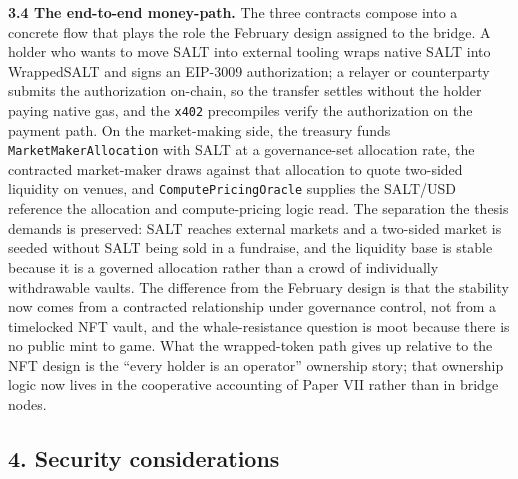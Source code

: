 \textbf{3.4 The end-to-end money-path.} The three contracts compose into
a concrete flow that plays the role the February design assigned to the
bridge. A holder who wants to move SALT into external tooling wraps
native SALT into WrappedSALT and signs an EIP-3009 authorization; a
relayer or counterparty submits the authorization on-chain, so the
transfer settles without the holder paying native gas, and the
\texttt{x402} precompiles verify the authorization on the payment path.
On the market-making side, the treasury funds
\texttt{MarketMakerAllocation} with SALT at a governance-set allocation
rate, the contracted market-maker draws against that allocation to quote
two-sided liquidity on venues, and \texttt{ComputePricingOracle}
supplies the SALT/USD reference the allocation and compute-pricing logic
read. The separation the thesis demands is preserved: SALT reaches
external markets and a two-sided market is seeded without SALT being
sold in a fundraise, and the liquidity base is stable because it is a
governed allocation rather than a crowd of individually withdrawable
vaults. The difference from the February design is that the stability
now comes from a contracted relationship under governance control, not
from a timelocked NFT vault, and the whale-resistance question is moot
because there is no public mint to game. What the wrapped-token path
gives up relative to the NFT design is the ``every holder is an
operator'' ownership story; that ownership logic now lives in the
cooperative accounting of Paper VII rather than in bridge nodes.

\subsection{4. Security considerations}\label{security-considerations}

